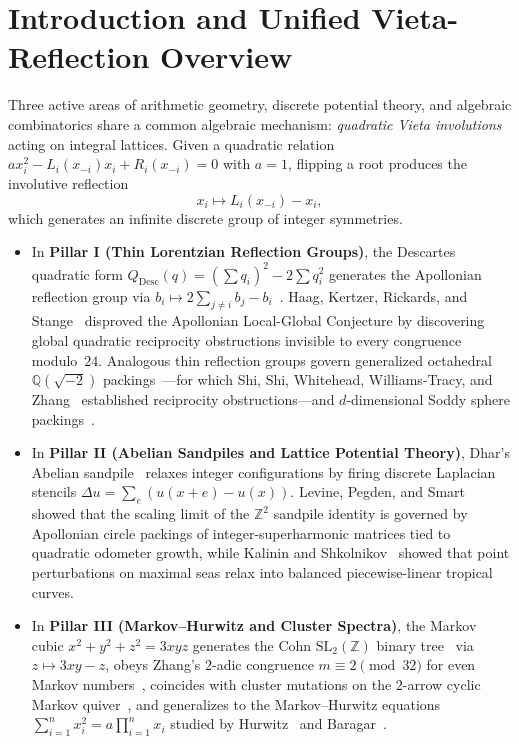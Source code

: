 \documentclass[11pt,reqno]{amsart}
\theoremstyle{plain}
\theoremstyle{definition}
\newcommand{\ZZ}{\mathbb{Z}}
\newcommand{\QQ}{\mathbb{Q}}
\newcommand{\SL}{\mathrm{SL}}
\begin{document}
\maketitle

\section{Introduction and Unified Vieta-Reflection Overview}
\label{sec:intro}

Three active areas of arithmetic geometry, discrete potential theory, and algebraic combinatorics share a common algebraic mechanism: \emph{quadratic Vieta involutions} acting on integral lattices. Given a quadratic relation $a x_i^2 - L_i(x_{-i}) x_i + R_i(x_{-i}) = 0$ with $a=1$, flipping a root produces the involutive reflection
\begin{equation}
  x_i \longmapsto L_i(x_{-i}) - x_i,
\end{equation}
which generates an infinite discrete group of integer symmetries.
\begin{itemize}[leftmargin=1.6em]
  \item In \textbf{Pillar I (Thin Lorentzian Reflection Groups)}, the Descartes quadratic form $Q_{\mathrm{Desc}}(q) = (\sum q_i)^2 - 2\sum q_i^2$ generates the Apollonian reflection group via $b_i \mapsto 2\sum_{j\neq i} b_j - b_i$~\cite{glmw2003,bf2011,fs2011}. Haag, Kertzer, Rickards, and Stange~\cite{hkrs2024} disproved the Apollonian Local-Global Conjecture by discovering global quadratic reciprocity obstructions invisible to every congruence modulo~$24$. Analogous thin reflection groups govern generalized octahedral $\QQ(\sqrt{-2})$ packings~\cite{stange2018,kn2019}—for which Shi, Shi, Whitehead, Williams-Tracy, and Zhang~\cite{shi2025} established reciprocity obstructions—and $d$-dimensional Soddy sphere packings~\cite{lmw2002}.
  \item In \textbf{Pillar II (Abelian Sandpiles and Lattice Potential Theory)}, Dhar's Abelian sandpile~\cite{dhar1990} relaxes integer configurations by firing discrete Laplacian stencils $\Delta u = \sum_{e}(u(x+e)-u(x))$. Levine, Pegden, and Smart~\cite{lps2016,lps2017} showed that the scaling limit of the $\ZZ^2$ sandpile identity is governed by Apollonian circle packings of integer-superharmonic matrices tied to quadratic odometer growth, while Kalinin and Shkolnikov~\cite{ks2016,kalinin2018} showed that point perturbations on maximal seas relax into balanced piecewise-linear tropical curves.
  \item In \textbf{Pillar III (Markov--Hurwitz and Cluster Spectra)}, the Markov cubic $x^2 + y^2 + z^2 = 3xyz$ generates the Cohn $\SL_2(\ZZ)$ binary tree~\cite{cohn1955,aigner2013} via $z \mapsto 3xy - z$, obeys Zhang's $2$-adic congruence $m \equiv 2 \pmod{32}$ for even Markov numbers~\cite{zhang2007}, coincides with cluster mutations on the $2$-arrow cyclic Markov quiver~\cite{fz2002,ls2015}, and generalizes to the Markov--Hurwitz equations $\sum_{i=1}^n x_i^2 = a \prod_{i=1}^n x_i$ studied by Hurwitz~\cite{hurwitz1907} and Baragar~\cite{baragar1993}.
\end{itemize}
\end{document}
